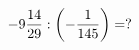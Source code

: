 \documentclass[preview]{standalone}
\begin{document}
\begin{align*}
-9 { 14 \over 29 }  :  \left( - { 1 \over 145 } \right) = ?
\end{align*}
\end{document}
